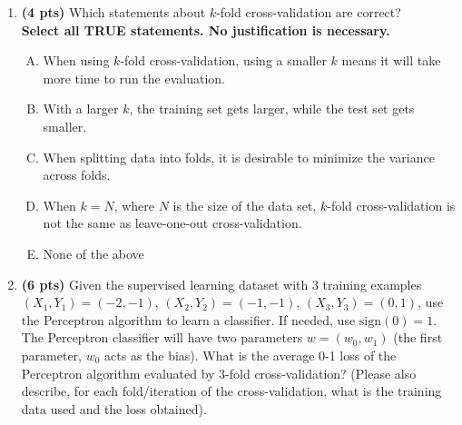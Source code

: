 \documentclass{article}
\begin{document}
\begin{enumerate}
%
%
 {}


\item \textbf{(4 pts)} Which statements about $k$-fold cross-validation are correct?\\
{\bf Select all TRUE statements. No justification is necessary.}
\begin{enumerate}[(A)]
    \item When using $k$-fold cross-validation, using a smaller $k$ means it will take more time to run the evaluation.
    \item With a larger $k$, the training set gets larger, while the test set gets smaller.
    \item When splitting data into folds, it is desirable to minimize the variance across folds.  
    \item When $k=N$, where $N$ is the size of the data set, $k$-fold cross-validation is not the same as leave-one-out cross-validation.
    \item None of the above
\end{enumerate}

%
%

 {}

\newpage
\newpage
\item \textbf{(6 pts)} Given the supervised learning dataset with 3 training examples $(X_1,Y_1) =(-2,-1)$, $(X_2,Y_2)=(-1,-1)$, $(X_3,Y_3) = (0,1)$, use the Perceptron algorithm to learn a classifier. If needed, use $\text{sign}(0)=1$.  The Perceptron classifier will have two parameters $w=(w_0, w_1)$ (the first parameter, $w_0$ acts as the bias).
What is the average 0-1 loss of the Perceptron algorithm evaluated by 3-fold cross-validation? (Please also describe, for each fold/iteration of the cross-validation, what is the training data used and the loss obtained).


\begin{tcolorbox}[breakable,
enhanced,
notitle,
width=15.5cm,
height=18cm]
{
}
\end{tcolorbox}
\end{enumerate}
\end{document}
